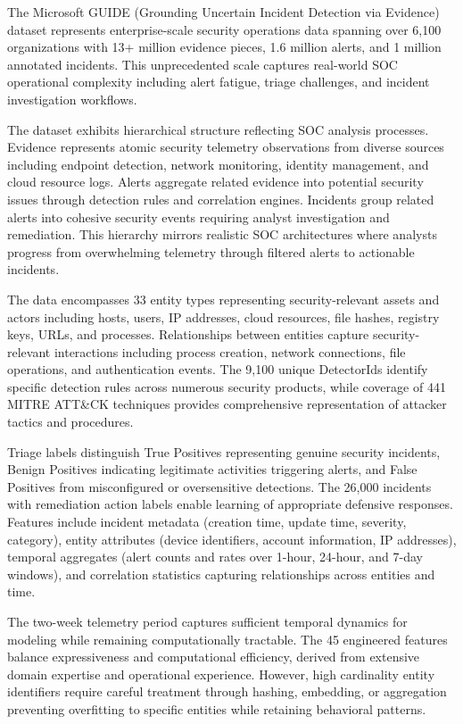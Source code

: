 \documentclass[10pt,journal,compsoc]{IEEEtran}
\begin{document}
The Microsoft GUIDE (Grounding Uncertain Incident Detection via Evidence) dataset represents enterprise-scale security operations data spanning over 6,100 organizations with 13+ million evidence pieces, 1.6 million alerts, and 1 million annotated incidents. This unprecedented scale captures real-world SOC operational complexity including alert fatigue, triage challenges, and incident investigation workflows.

The dataset exhibits hierarchical structure reflecting SOC analysis processes. Evidence represents atomic security telemetry observations from diverse sources including endpoint detection, network monitoring, identity management, and cloud resource logs. Alerts aggregate related evidence into potential security issues through detection rules and correlation engines. Incidents group related alerts into cohesive security events requiring analyst investigation and remediation. This hierarchy mirrors realistic SOC architectures where analysts progress from overwhelming telemetry through filtered alerts to actionable incidents.

The data encompasses 33 entity types representing security-relevant assets and actors including hosts, users, IP addresses, cloud resources, file hashes, registry keys, URLs, and processes. Relationships between entities capture security-relevant interactions including process creation, network connections, file operations, and authentication events. The 9,100 unique DetectorIds identify specific detection rules across numerous security products, while coverage of 441 MITRE ATT&CK techniques provides comprehensive representation of attacker tactics and procedures.

Triage labels distinguish True Positives representing genuine security incidents, Benign Positives indicating legitimate activities triggering alerts, and False Positives from misconfigured or oversensitive detections. The 26,000 incidents with remediation action labels enable learning of appropriate defensive responses. Features include incident metadata (creation time, update time, severity, category), entity attributes (device identifiers, account information, IP addresses), temporal aggregates (alert counts and rates over 1-hour, 24-hour, and 7-day windows), and correlation statistics capturing relationships across entities and time.

The two-week telemetry period captures sufficient temporal dynamics for modeling while remaining computationally tractable. The 45 engineered features balance expressiveness and computational efficiency, derived from extensive domain expertise and operational experience. However, high cardinality entity identifiers require careful treatment through hashing, embedding, or aggregation preventing overfitting to specific entities while retaining behavioral patterns.
\end{document}
